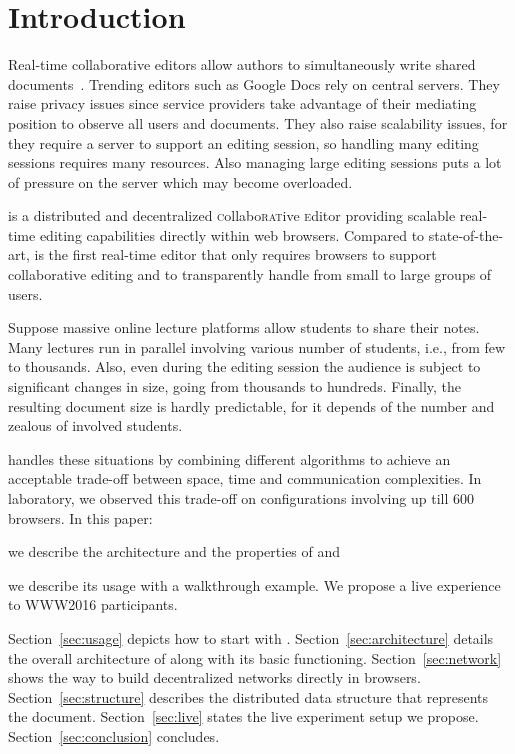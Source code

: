 
\section{Introduction}
\label{sec:introduction}

Real-time collaborative editors allow authors to simultaneously write shared
documents~\cite{greenberg1994real}. Trending editors such as Google Docs rely on
central servers. They raise privacy issues since service providers take
advantage of their mediating position to observe all users and documents. They
also raise scalability issues, for they require a server to support an editing
session, so handling many editing sessions requires many resources. Also
managing large editing sessions puts a lot of pressure on the server which may
become overloaded.


\CRATE is a distributed and decentralized \textsc{c}ollabo\textsc{rat}ive
\textsc{e}ditor providing scalable real-time editing capabilities directly
within web browsers. Compared to state-of-the-art, \CRATE is the first real-time
editor that only requires browsers to support collaborative editing and to
transparently handle from small to large groups of users.

Suppose massive online lecture platforms allow students to share their
notes. Many lectures run in parallel involving various number of students, i.e.,
from few to thousands. Also, even during the editing session the audience is subject
to significant changes in size, going from thousands to hundreds. Finally, the
resulting document size is hardly predictable, for it depends of the number and
zealous of involved students.

\CRATE handles these situations by combining different algorithms to
achieve an acceptable trade-off between space, time and communication
complexities. In laboratory, we observed this trade-off on configurations
involving up till 600 browsers. In this paper:
\begin{inparaenum}[(i)]
\item we describe the architecture and the properties of \CRATE and
\item we describe its usage with a walkthrough example. We propose
  a live experience to WWW2016 participants.
\end{inparaenum}

Section~\ref{sec:usage} depicts how to start with \CRATE.
Section~\ref{sec:architecture} details the overall architecture of \CRATE along
with its basic functioning. Section~\ref{sec:network} shows the way to build
decentralized networks directly in browsers.  Section~\ref{sec:structure}
describes the distributed data structure that represents the document.
Section~\ref{sec:live} states the live experiment setup we
propose. Section~\ref{sec:conclusion} concludes.


